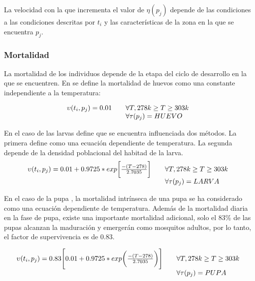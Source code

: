 La velocidad con la que incrementa el valor de $\eta(p_{j})$ depende de las condiciones a las condiciones
descritas  por $t_{i}$ y las características de la zona en la que se encuentra $p_{j}$.

\subsubsection{Mortalidad}
La mortalidad de los individuos depende de la etapa del ciclo de desarrollo en la que se encuentren. En 
\cite{otero2006stochastic} se define la mortalidad de huevos como una constante independiente a la temperatura:

\begin{equation}
 \begin{array}{l l}
    \upsilon(t_{i}, p_{j}) = 0.01 & \quad \forall T,  278 k \geq T \geq 303 k\\
              & \quad \forall \tau(p_{j}) = HUEVO 
\end{array}
\end{equation}

En el caso de las larvas \cite{otero2006stochastic} define que se encuentra influenciada dos métodos. La primera
define como una ecuación dependiente de temperatura. La segunda depende de la densidad poblacional del habitad de la
larva.
\begin{equation}
 \begin{array}{l l}
\upsilon(t_{i}, p_{j}) = 0.01 + 0.9725 * exp\bigg[ \frac{-(T - 278)}{2.7035}\bigg] &\quad  \forall T, 278 k \geq T \geq 303 k\\
              & \quad \forall \tau(p_{j}) = LARVA
 
\end{array}
\end{equation}

En el caso de la pupa \cite{otero2006stochastic}, la mortalidad intrínseca de una pupa se ha considerado como 
una ecuación dependiente de temperatura. Además de la mortalidad diaria en la fase de pupa, existe una importante 
mortalidad adicional, solo el 83\% \cite{otero2006stochastic} de las pupas alcanzan la maduración y emergerán como
mosquitos adultos, por lo tanto, el factor de supervivencia es de 0.83.

\begin{equation}
 \begin{array}{l l}

  \upsilon(t_{i}, p_{j}) = 0.83 \Bigg[ 0.01 + 0.9725 * exp\bigg( \frac{-(T - 278)}{2.7035}\bigg)\Bigg] &\quad  \forall T, 278 k \geq T \geq 303 k\\
              & \quad \forall \tau(p_{j}) = PUPA
\end{array}
\end{equation}

